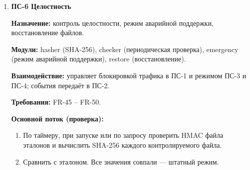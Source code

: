 \documentclass[13pt,a4paper,final]{article}
\begin{document}
\begin{enumerate}
		\textbf{События:} E50 (отказ в доступе по роли) — в ПС-2.
		
		\textbf{ПС-5 \textcolor{edit}{Авторизация}}
		
		\textbf{Назначение:} учётные записи, аутентификация, сеансы и роли.
		
		\textbf{Модули:} accounts, auth, sessions, roles.
		
		\textbf{Взаимодействие:} вызывается ПС-3 и ПС-4 при входе и для контроля активности; события передаёт в ПС-2.
		
		\textbf{Требования:} FR-30 – FR-37.
		
		\textbf{Основной поток (вход администратора):}
		\begin{enumerate}
			\item Принять идентификатор и пароль, проверить, не заблокирован ли вход.
			\item Сравнить хэш пароля с хранимым.
			\item Определить роль по учётной записи.
			\item Если роль «чтение/запись» и уже есть активный сеанс с этой ролью, понизить роль до «только чтение», вывести М04, зарегистрировать Е04.
			\item Создать сеанс, зарегистрировать Е01.
		\end{enumerate}
		
		\textbf{Альтернативные потоки:}
		\begin{itemize}
			\item Вход заблокирован — М12.
			\item Хэш не совпал — М02, Е03; после 5 неудач подряд — блокировка, М12, Е06 (FR-31).
		\end{itemize}
		
		\item \textbf{ПС-6 Целостность}
		
		\textbf{Назначение:} контроль целостности, режим аварийной поддержки, восстановление файлов.
		
		\textbf{Модули:} hasher (SHA-256), checker (периодическая проверка), emergency (режим аварийной поддержки), restore (восстановление).
		
		\textbf{Взаимодействие:} управляет блокировкой трафика в ПС-1 и режимом ПС-3 и ПС-4; события передаёт в ПС-2.
		
		\textbf{Требования:} FR-45 – FR-50.
		
		\textbf{Основной поток (проверка):}
		\begin{enumerate}
			\item По таймеру, при запуске или по запросу проверить HMAC файла эталонов и вычислить SHA-256 каждого контролируемого файла.
			\item Сравнить с эталоном. Все значения совпали — штатный режим.
		\end{enumerate}
		

\end{enumerate}
\end{document}
